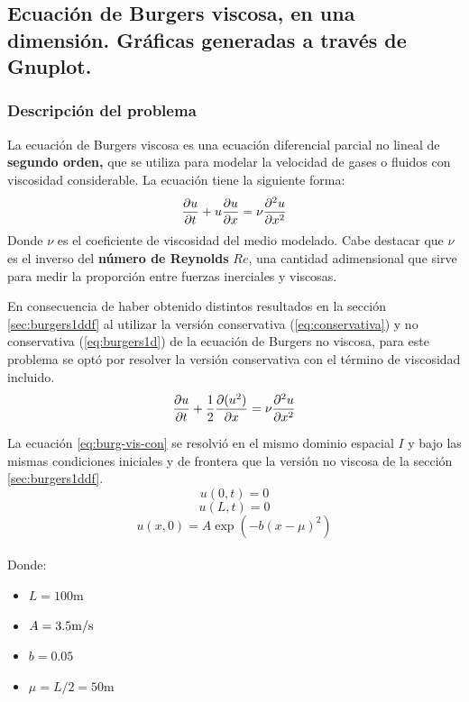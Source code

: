 \documentclass[12pt]{article}
\newcommand{\mpers}{\unit[per-mode = symbol]{\metre\per\second}}
\begin{document}
	\newpage
	\subsection{Ecuación de Burgers viscosa, en una dimensión. Gráficas generadas a través de \textbf{Gnuplot.}}
	\label{sec:burg-vis1ddf}
	\subsubsection{Descripción del problema}
	La ecuación de Burgers viscosa es una ecuación diferencial parcial no lineal de \textbf{segundo orden,} que se utiliza para modelar la velocidad de gases o fluidos con viscosidad considerable. La ecuación tiene la siguiente forma:
	\begin{equation}
		\pdv{u}{t}+u\pdv{u}{x}=\nu \pdv{^2 u}{x^2}
		\label{eq:burg-vis}
	\end{equation}
	Donde $\nu$ es el coeficiente de viscosidad del medio modelado. Cabe destacar que $\nu$ es el inverso del \textbf{número de Reynolds} $Re$, una cantidad adimensional que sirve para medir la proporción entre fuerzas inerciales y viscosas. 

	En consecuencia de haber obtenido distintos resultados en la sección \ref{sec:burgers1ddf} al utilizar la versión conservativa (\ref{eq:conservativa}) y no conservativa (\ref{eq:burgers1d}) de la ecuación de Burgers no viscosa, para este problema se optó por resolver la versión conservativa con el término de viscosidad incluido.
	\begin{equation}
		\pdv{u}{t}+\frac{1}{2}\pdv{(u^2)}{x}=\nu \pdv{^2 u}{x^2}
		\label{eq:burg-vis-con}
	\end{equation}
	
 	La ecuación \ref{eq:burg-vis-con} se resolvió en el mismo dominio espacial $I$ y bajo las mismas condiciones iniciales y de frontera que la versión no viscosa de la sección \ref{sec:burgers1ddf}. 
 	\begin{equation}
 		u(0,t)=0
 	\end{equation}
 	\begin{equation}
 		u(L,t)= 0
 	\end{equation}
	\begin{equation}
		u(x,0) = A\exp(-b(x-\mu)^{2})
		\label{eq:condinicial-vis}
	\end{equation}
	\\
	Donde:
	\begin{itemize}
		\item $L = 100\unit{\meter}$
		\item $A=3.5\mpers$
		\item $b=0.05$
		\item $\mu=L/2=50\unit{\meter}$
	\end{itemize}
	
\end{document}
